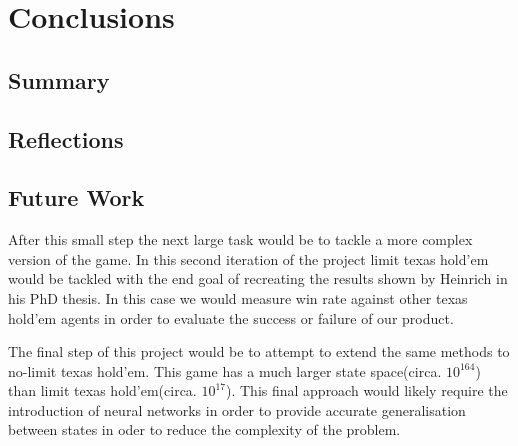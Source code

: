 \chapter{Conclusions}
\label{ch:conclusions}

\section{Summary}
\label{sec:summary}

\section{Reflections}
\label{sec:reflections}

\section{Future Work}\label{sec:futureWork}

After this small step the next large task would be to tackle a more complex version of the game.
In this second iteration of the project limit texas hold'em would be tackled with the end goal of recreating
the results shown by Heinrich in his PhD thesis\citep{heinrich2017reinforcement}.
In this case we would measure win rate against other texas hold'em agents in order to evaluate
the success or failure of our product.

The final step of this project would be to attempt to extend the same methods to no-limit texas hold'em.
This game has a much larger state space(circa. $10^{164}$) than limit texas hold'em(circa. $10^{17}$).
This final approach would likely require the introduction of neural networks in order to provide accurate
generalisation between states in oder to reduce the complexity of the problem.